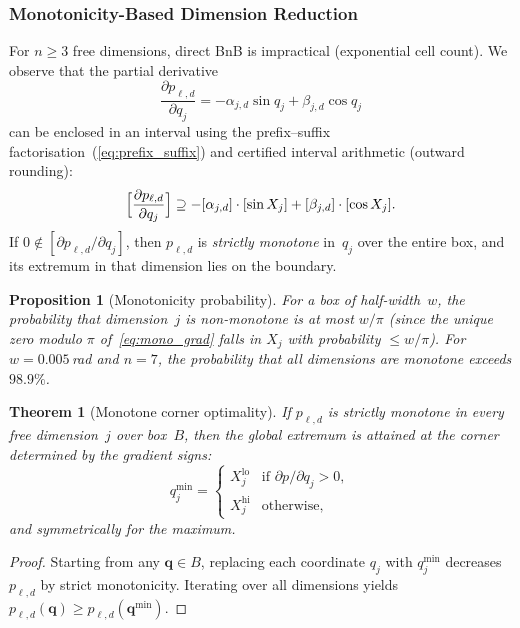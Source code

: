 \documentclass[journal]{IEEEtran}
\newtheorem{theorem}{Theorem}
\newtheorem{proposition}{Proposition}
\begin{document}
\subsubsection{Monotonicity-Based Dimension Reduction}

For $n \geq 3$ free dimensions, direct BnB is impractical
(exponential cell count).
We observe that the partial derivative
\begin{equation}\label{eq:mono_grad}
  \frac{\partial p_{\ell,d}}{\partial q_j}
  = -\alpha_{j,d}\sin q_j + \beta_{j,d}\cos q_j
\end{equation}
can be enclosed in an interval using the prefix--suffix
factorisation~(\cref{eq:prefix_suffix}) and certified interval
arithmetic (outward rounding):
\begin{equation}\label{eq:mono_test}
  \Bigl[\frac{\partial p_{\ell,d}}{\partial q_j}\Bigr]
  \supseteq -[\alpha_{j,d}]\cdot[\sin X_j]
  + [\beta_{j,d}]\cdot[\cos X_j].
\end{equation}
If $0 \notin [\partial p_{\ell,d}/\partial q_j]$, then
$p_{\ell,d}$ is \emph{strictly monotone} in~$q_j$ over the
entire box, and its extremum in that dimension lies on
the boundary.

\begin{proposition}[Monotonicity probability]\label{prop:mono_prob}
For a box of half-width~$w$, the probability that dimension~$j$
is non-monotone is at most $w/\pi$ (since the unique zero modulo
$\pi$ of~\eqref{eq:mono_grad} falls in $X_j$ with probability
$\leq w/\pi$).
For $w = 0.005$\,rad and $n = 7$, the probability that all
dimensions are monotone exceeds $98.9\%$.
\end{proposition}

\begin{theorem}[Monotone corner optimality]\label{thm:mono_corner}
If $p_{\ell,d}$ is strictly monotone in every free
dimension~$j$ over box~$B$, then the global extremum is
attained at the corner determined by the gradient signs:
\begin{equation}\label{eq:corner}
  q_j^{\min} = \begin{cases}
    X_j^{\mathrm{lo}} & \text{if } \partial p/\partial q_j > 0, \\
    X_j^{\mathrm{hi}} & \text{otherwise},
  \end{cases}
\end{equation}
and symmetrically for the maximum.
\end{theorem}
\begin{proof}
Starting from any $\bm{q} \in B$, replacing each coordinate
$q_j$ with $q_j^{\min}$ decreases $p_{\ell,d}$ by strict
monotonicity.  Iterating over all dimensions yields
$p_{\ell,d}(\bm{q}) \geq p_{\ell,d}(\bm{q}^{\min})$.
\end{proof}
\end{document}
